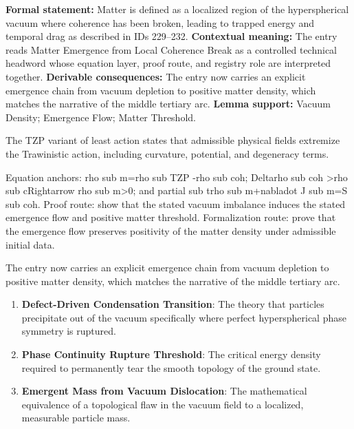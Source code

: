 \begingroup\footnotesize\setlength{\emergencystretch}{3em}\sloppy
\textbf{Formal statement:} Matter is defined as a localized region of the hyperspherical vacuum where coherence has been broken, leading to trapped energy and temporal drag as described in IDs 229--232. \textbf{Contextual meaning:} The entry reads Matter Emergence from Local Coherence Break as a controlled technical headword whose equation layer, proof route, and registry role are interpreted together. \textbf{Derivable consequences:} The entry now carries an explicit emergence chain from vacuum depletion to positive matter density, which matches the narrative of the middle tertiary arc. \textbf{Lemma support:} Vacuum Density; Emergence Flow; Matter Threshold.\par
\endgroup

The TZP variant of least action states that admissible physical fields extremize the Trawinistic action, including curvature, potential, and degeneracy terms.

Equation anchors: rho sub m=rho sub TZP -rho sub coh; Deltarho sub coh >rho sub cRightarrow rho sub m>0; and partial sub trho sub m+nabladot J sub m=S sub coh. Proof route: show that the stated vacuum imbalance induces the stated emergence flow and positive matter threshold. Formalization route: prove that the emergence flow preserves positivity of the matter density under admissible initial data.

The entry now carries an explicit emergence chain from vacuum depletion to positive matter density, which matches the narrative of the middle tertiary arc.
\endgroup

\begin{enumerate}[leftmargin=1.6em,itemsep=6pt,topsep=4pt]
\item \textbf{Defect-Driven Condensation Transition}: The theory that particles precipitate out of the vacuum specifically where perfect hyperspherical phase symmetry is ruptured.
\item \textbf{Phase Continuity Rupture Threshold}: The critical energy density required to permanently tear the smooth topology of the ground state.
\item \textbf{Emergent Mass from Vacuum Dislocation}: The mathematical equivalence of a topological flaw in the vacuum field to a localized, measurable particle mass.
\end{enumerate}

